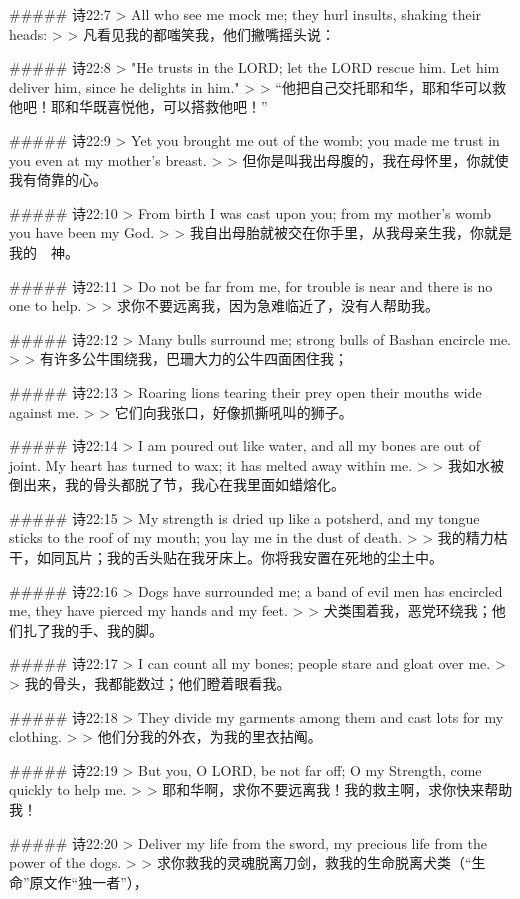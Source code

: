 ##### 诗22:7
> All who see me mock me; they hurl insults, shaking their heads:
>
> 凡看见我的都嗤笑我，他们撇嘴摇头说：


##### 诗22:8
> "He trusts in the LORD; let the LORD rescue him. Let him deliver him, since he delights in him."
>
> “他把自己交托耶和华，耶和华可以救他吧！耶和华既喜悦他，可以搭救他吧！”


##### 诗22:9
> Yet you brought me out of the womb; you made me trust in you even at my mother's breast.
>
> 但你是叫我出母腹的，我在母怀里，你就使我有倚靠的心。


##### 诗22:10
> From birth I was cast upon you; from my mother's womb you have been my God.
>
> 我自出母胎就被交在你手里，从我母亲生我，你就是我的　神。


##### 诗22:11
> Do not be far from me, for trouble is near and there is no one to help.
>
> 求你不要远离我，因为急难临近了，没有人帮助我。


##### 诗22:12
> Many bulls surround me; strong bulls of Bashan encircle me.
>
> 有许多公牛围绕我，巴珊大力的公牛四面困住我；


##### 诗22:13
> Roaring lions tearing their prey open their mouths wide against me.
>
> 它们向我张口，好像抓撕吼叫的狮子。


##### 诗22:14
> I am poured out like water, and all my bones are out of joint. My heart has turned to wax; it has melted away within me.
>
> 我如水被倒出来，我的骨头都脱了节，我心在我里面如蜡熔化。


##### 诗22:15
> My strength is dried up like a potsherd, and my tongue sticks to the roof of my mouth; you lay me in the dust of death.
>
> 我的精力枯干，如同瓦片；我的舌头贴在我牙床上。你将我安置在死地的尘土中。


##### 诗22:16
> Dogs have surrounded me; a band of evil men has encircled me, they have pierced my hands and my feet.
>
> 犬类围着我，恶党环绕我；他们扎了我的手、我的脚。


##### 诗22:17
> I can count all my bones; people stare and gloat over me.
>
> 我的骨头，我都能数过；他们瞪着眼看我。


##### 诗22:18
> They divide my garments among them and cast lots for my clothing.
>
> 他们分我的外衣，为我的里衣拈阄。


##### 诗22:19
> But you, O LORD, be not far off; O my Strength, come quickly to help me.
>
> 耶和华啊，求你不要远离我！我的救主啊，求你快来帮助我！


##### 诗22:20
> Deliver my life from the sword, my precious life from the power of the dogs.
>
> 求你救我的灵魂脱离刀剑，救我的生命脱离犬类（“生命”原文作“独一者”），



